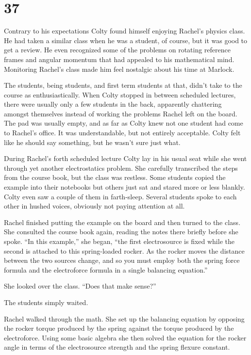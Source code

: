 
\chapter{37}

Contrary to his expectations Colty found himself enjoying Rachel's physics class. He had taken a
similar class when he was a student, of course, but it was good to get a review. He even
recognized some of the problems on rotating reference frames and angular momentum that had
appealed to his mathematical mind. Monitoring Rachel's class made him feel nostalgic about his
time at Marlock.

The students, being students, and first term students at that, didn't take to the course as
enthusiastically. When Colty stopped in between scheduled lectures, there were usually only a
few students in the back, apparently chattering amongst themselves instead of working the
problems Rachel left on the board. The pad was usually empty, and as far as Colty knew not one
student had come to Rachel's office. It was understandable, but not entirely acceptable. Colty
felt like he should say something, but he wasn't sure just what.

During Rachel's forth scheduled lecture Colty lay in his usual seat while she went through yet
another electrostatics problem. She carefully transcribed the steps from the course book, but
the class was restless. Some students copied the example into their notebooks but others just
sat and stared more or less blankly. Colty even saw a couple of them in farth-sleep. Several
students spoke to each other in hushed voices, obviously not paying attention at all.

Rachel finished putting the example on the board and then turned to the class. She consulted the
course book again, reading the notes there briefly before she spoke. ``In this example,'' she
began, ``the first electrosource is fixed while the second is attached to this spring-loaded
rocker. As the rocker moves the distance between the two sources change, and so you must employ
both the spring force formula and the electroforce formula in a single balancing equation.''

She looked over the class. ``Does that make sense?''

The students simply waited.

Rachel walked through the math. She set up the balancing equation by opposing the rocker torque
produced by the spring against the torque produced by the electroforce. Using some basic algebra
she then solved the equation for the rocker angle in terms of the electrosource strength and the
spring flexure constant.

